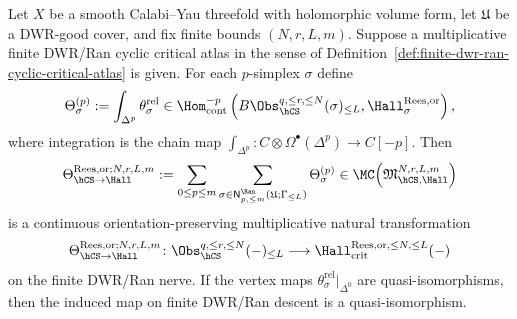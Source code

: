 \begin{theorem}
\label{thm:finite-dwr-ran-hcs-rees-hall-construction}
Let $X$ be a smooth Calabi--Yau threefold with holomorphic volume form,
let $\mathfrak U$ be a DWR-good cover, and fix finite bounds
$(N,r,L,m)$. Suppose a multiplicative finite DWR/Ran cyclic critical
atlas in the sense of
Definition~\ref{def:finite-dwr-ran-cyclic-critical-atlas} is given.
For each $p$-simplex $\sigma$ define
\[
 \Theta_\sigma^{(p)}
 :=
 \int_{\Delta^p}\theta_\sigma^{\mathrm{rel}}
 \in
 \Hom_{\mathrm{cont}}^{-p}
 \left(
 B\Obs_{\hCS}^{q,\leq r,\leq N}(\sigma)_{\leq L},
 \Hall_{\sigma}^{\mathrm{Rees},\mathrm{or}}
 \right),
\]
where integration is the chain map
$\int_{\Delta^p}\colon C\otimes\Omega^\bullet(\Delta^p)\to C[-p]$.
Then
\[
 \Theta_{\hCS\to\Hall}^{\mathrm{Rees},\mathrm{or};N,r,L,m}
 :=
 \sum_{0\leq p\leq m}
 \sum_{\sigma\in
 \mathsf N^{\Ran}_{p,\leq m}(\mathfrak U;\Gamma_{\leq L})}
 \Theta_\sigma^{(p)}
 \in
 \MC\!\left(\mathfrak M_{\hCS,\Hall}^{N,r,L,m}\right)
\]
is a continuous orientation-preserving multiplicative natural
transformation
\[
 \Theta_{\hCS\to\Hall}^{\mathrm{Rees},\mathrm{or};N,r,L,m}\colon
 \Obs_{\hCS}^{q,\leq r,\leq N}(-)_{\leq L}
 \longrightarrow
 \Hall_{\mathrm{crit}}^{\mathrm{Rees},\mathrm{or},\leq N,\leq L}(-)
\]
on the finite DWR/Ran nerve. If the vertex maps
$\theta_\sigma^{\mathrm{rel}}|_{\Delta^0}$ are quasi-isomorphisms, then
the induced map on finite DWR/Ran descent is a quasi-isomorphism.
\end{theorem}

